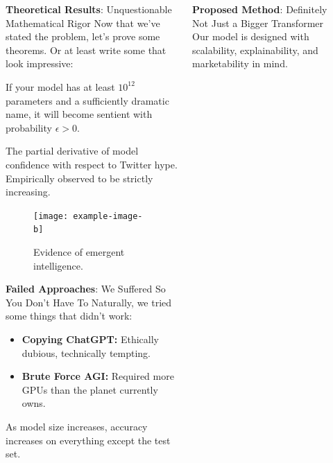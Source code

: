 \documentclass[final,dvipsnames]{beamer}
\begin{document}
\begin{frame}[t]
\begin{columns}[t]
\begin{column}{\colwidth}
		\end{column}


		\begin{column}{\colwidth}

			\begin{block}{\textbf{Theoretical Results}: Unquestionable Mathematical Rigor}
				Now that we've stated the problem, let's prove some theorems. Or at least write some that look impressive:

				\begin{theorem}
					If your model has at least \(10^{12}\) parameters and a sufficiently dramatic name, it will become sentient with probability \(\epsilon > 0\).
				\end{theorem}

				\begin{definition}
					The partial derivative of model confidence with respect to Twitter hype. Empirically observed to be strictly increasing.
				\end{definition}

				\begin{figure}[H]
					\centering
					\texttt{[image: example-image-b]}
					\caption{Evidence of emergent intelligence.}
				\end{figure}
			\end{block}

			\begin{block}{\textbf{Failed Approaches}: We Suffered So You Don't Have To}
				Naturally, we tried some things that didn't work:

				\begin{itemize}
					\item \textbf{Copying ChatGPT:} Ethically dubious, technically tempting.
					\item \textbf{Brute Force AGI:} Required more GPUs than the planet currently owns.
				\end{itemize}

				\begin{theorem}
					As model size increases, accuracy increases on everything except the test set.
				\end{theorem}
			\end{block}

		\end{column}

		\begin{column}{\colwidth}

			\begin{block}{\textbf{Proposed Method}: Definitely Not Just a Bigger Transformer}
				Our model is designed with scalability, explainability, and marketability in mind.


\end{block}
\end{column}
\end{columns}
\end{frame}
\end{document}
